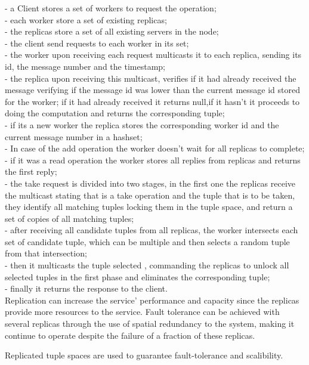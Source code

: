 \documentclass[times, 10pt,two column]{article}
\begin{document}
 - a Client stores a set of workers to request the operation;\\
 - each worker store a set of existing replicas;\\
 - the replicas store a set of all existing servers in the node;\\
 - the client send requests to each worker in its set;\\
 - the worker upon receiving each request multicasts it to each replica, sending its id, the message number and the timestamp;\\
 - the replica upon receiving this multicast, verifies if it had already received the message verifying if the message id was lower than the current message id stored for the worker; if it had already received it returns null,if it hasn't it proceeds to doing the computation and returns the corresponding tuple;\\
 - if its a new worker the replica stores the corresponding worker id and the current message number in a hashset;\\
 - In case of the add operation the worker doesn't wait for all replicas to complete;\\
 - if it was a read operation the worker stores all replies from replicas and returns the first reply;\\
 - the take request is divided into two stages, in the first one the replicas receive the multicast stating that is a take operation and the tuple that is to be taken, they identify all matching tuples locking them in the tuple space, and return a set of copies of all matching tuples;\\
 - after receiving all candidate tuples from all replicas, the worker intersects each set of candidate tuple, which can be multiple and then selects a random tuple from that intersection;\\
 - then it multicasts the tuple selected , commanding the replicas to unlock all selected tuples in the first phase and eliminates the corresponding tuple;\\
 - finally it returns the response to the client.\\
 
Replication can increase the service’ performance and capacity since the replicas provide more resources to the service. 
Fault tolerance can be achieved with several replicas through the use of spatial redundancy to the system, making it continue to operate despite the failure of a fraction of these replicas.

Replicated tuple spaces are used to guarantee fault-tolerance and scalibility.
\end{document}
